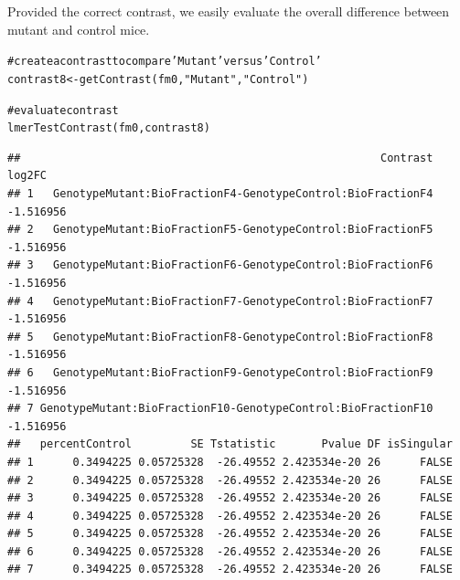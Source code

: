 \documentclass[11pt]{elife}\usepackage[]{graphicx}\usepackage[]{color}
\makeatletter
\newcommand{\hlstr}[1]{\textcolor[rgb]{0.063,0.58,0.627}{#1}}%
\newcommand{\hlcom}[1]{\textcolor[rgb]{0.588,0.588,0.588}{#1}}%
\newcommand{\hlstd}[1]{\textcolor[rgb]{0.196,0.196,0.196}{#1}}%
\newcommand{\hlkwb}[1]{\textcolor[rgb]{0.627,0,0.314}{#1}}%
\newcommand{\hlkwd}[1]{\textcolor[rgb]{0.78,0.227,0.412}{#1}}%
\newenvironment{kframe}{%
 \def\at@end@of@kframe{}%
 \ifinner\ifhmode%
  \def\at@end@of@kframe{\end{minipage}}%
  \begin{minipage}{\columnwidth}%
 \fi\fi%
 \def\FrameCommand##1{\hskip\@totalleftmargin \hskip-\fboxsep
 \colorbox{shadecolor}{##1}\hskip-\fboxsep
     \hskip-\linewidth \hskip-\@totalleftmargin \hskip\columnwidth}%
 \MakeFramed {\advance\hsize-\width
   \@totalleftmargin\z@ \linewidth\hsize
   \@setminipage}}%
 {\par\unskip\endMakeFramed%
 \at@end@of@kframe}
\newenvironment{knitrout}{}{} %
\makeatother
\begin{document}
Provided the correct contrast, we easily evaluate the overall difference
between mutant and control mice.
\begin{knitrout}
\color{fgcolor}\begin{kframe}
\begin{alltt}
\hlcom{# create a contrast to compare 'Mutant' versus 'Control'}
\hlstd{contrast8} \hlkwb{<-} \hlkwd{getContrast}\hlstd{(fm0,} \hlstr{"Mutant"}\hlstd{,}\hlstr{"Control"}\hlstd{)}

\hlcom{# evaluate contrast}
\hlkwd{lmerTestContrast}\hlstd{(fm0, contrast8)}
\end{alltt}
\begin{verbatim}
##                                                       Contrast    log2FC
## 1   GenotypeMutant:BioFractionF4-GenotypeControl:BioFractionF4 -1.516956
## 2   GenotypeMutant:BioFractionF5-GenotypeControl:BioFractionF5 -1.516956
## 3   GenotypeMutant:BioFractionF6-GenotypeControl:BioFractionF6 -1.516956
## 4   GenotypeMutant:BioFractionF7-GenotypeControl:BioFractionF7 -1.516956
## 5   GenotypeMutant:BioFractionF8-GenotypeControl:BioFractionF8 -1.516956
## 6   GenotypeMutant:BioFractionF9-GenotypeControl:BioFractionF9 -1.516956
## 7 GenotypeMutant:BioFractionF10-GenotypeControl:BioFractionF10 -1.516956
##   percentControl         SE Tstatistic       Pvalue DF isSingular
## 1      0.3494225 0.05725328  -26.49552 2.423534e-20 26      FALSE
## 2      0.3494225 0.05725328  -26.49552 2.423534e-20 26      FALSE
## 3      0.3494225 0.05725328  -26.49552 2.423534e-20 26      FALSE
## 4      0.3494225 0.05725328  -26.49552 2.423534e-20 26      FALSE
## 5      0.3494225 0.05725328  -26.49552 2.423534e-20 26      FALSE
## 6      0.3494225 0.05725328  -26.49552 2.423534e-20 26      FALSE
## 7      0.3494225 0.05725328  -26.49552 2.423534e-20 26      FALSE
\end{verbatim}
\end{kframe}
\end{knitrout}
\end{document}
